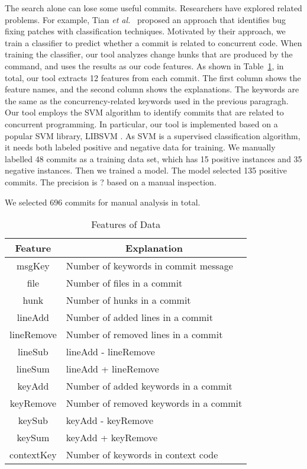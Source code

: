 The search alone can lose some useful commits. Researchers have explored related problems. For example, Tian \emph{et al.}~\cite{tian2012identifying} proposed an approach that identifies bug fixing patches with classification techniques. Motivated by their approach, we train a classifier to predict whether a commit is related to concurrent code. When training the classifier, our tool analyzes change hunks that are produced by the  command, and uses the results as our code features. As shown in Table~\ref{table:feature}, in total, our tool extracts 12 features from each commit. The first column shows the feature names, and the second column shows the explanations. The keywords are the same as the concurrency-related keywords used in the previous paragragh. Our tool employs the SVM \cite{journals/ml/CortesV95} algorithm to identify commits that are related to concurrent programming. In particular, our tool is implemented based on a popular SVM library, LIBSVM \cite{libsvm}. As SVM is a supervised classification algorithm, it needs both labeled positive and negative data for training. We manually labelled 48 commits as a training data set, which has 15 positive instances and 35 negative instances. Then we trained a model. The model selected 135 positive commits. The precision is ? based on a manual inspection.

We selected 696 commits for manual analysis in total.




\begin{table}
	\centering
	\caption{Features of Data}\vspace*{-2ex}
	\label{table:feature}
	\begin{tabular}{|c|l|}\hline
		Feature&\multicolumn{1}{|c|}{Explanation}\\\hline
		msgKey&Number of keywords in commit message\\
		file&Number of files in a commit\\
		hunk&Number of hunks in a commit\\
		lineAdd&Number of added lines in a commit\\
		lineRemove&Number of removed lines in a commit\\
		lineSub&lineAdd - lineRemove\\
		lineSum&lineAdd + lineRemove\\
		keyAdd&Number of added keywords in a commit\\
		keyRemove&Number of removed keywords in a commit\\
		keySub&keyAdd - keyRemove\\
		keySum&keyAdd + keyRemove\\
		contextKey&Number of keywords in context code\\\hline
	\end{tabular}\vspace*{-3ex}
\end{table}

